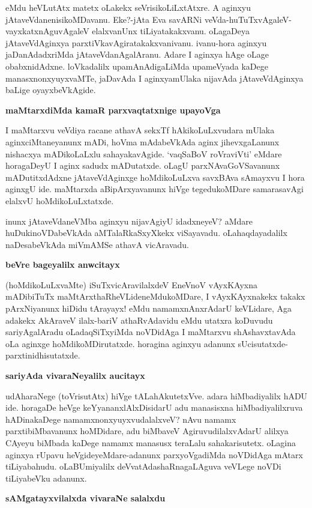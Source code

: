 eMdu heVLutAtx matetx oLakekx seVrisikoLiLxtAtxre. A aginxyu 
jAtaveVdanenisikoMDavanu. Eke?-jAta Eva savARNi 
veVda-huTuTxvAgaleV-vayxkatxnAguvAgaleV elalxvanUnx tiLiyatakakxvanu. oLagaDeya jAtaveVdAginxya parxtiVkavAgiratakakxvanivanu. ivanu-hora aginxyu jaDanAdadxriMda jAtaveVdanAgalAranu. Adare I aginxya hAge oLage obabxnidAdxne. loVkadalilx upamAnAdigaLiMda upameVyada kaDege manasxnonx\-yuyxvaMTe, jaDavAda I aginxyamUlaka nijavAda jAtaveVdAginxya baLige oyayxbeVkAgide.

\noindent
\textbf{maMtarxdiMda kamaR parxvaqtatxnige upayoVga}\label{page117}

I maMtarxvu veVdiya racane athavA sekxTf hAkikoLuLxvudara mUlaka 
aginxciMtaneyanunx mADi, hoVma mAdabeVkAda aginx jihevxgaLanunx nishacxya mADikoLaLxlu sahayakavAgide. `vaqSaBoV roVraviVti' eMdare horagaDeyU I aginx sadudx mADutatxde. oLagU parxNAvaGoVSavanunx mADutitxdAdxne jAtaveVdAginxge hoMdikoLuLxva savxBAva sAmayxvu I hora aginxgU ide. maMtarxda aBipArxyavanunx hiVge tegedukoMDare samarasavAgi elalxvU hoMdikoLuLxtatxde.

inunx jAtaveVdaneVMba aginxyu nijavAgiyU idadxneyeV? aMdare 
huDukinoVDabeVkAda \-aMTalaRkaSxyXkekx viSayavadu. oLahaqdayadalilx naDesabeVkAda miVmAMSe athavA vicAravadu.

\noindent
\textbf{beVre bageyalilx anwcitayx}\label{page117}

(hoMdikoLuLxvaMte) iSuTxvicAravilalxdeV EneVnoV vAyxKAyxna mADibiTuTx 
maMtArxthaRheVLi\-deneMdukoMDare, I vAyxKAyxnakekx takakx pArxNiyanunx 
hiDidu tArayayx! eMdu namamxnAnxrAdarU keVLidare, Aga adakekx 
\-AkAraveV ilalx-bariV athaRvAdavidu eMdu utatxra koDuvudu 
sariyAgalAradu oLadaqSiTxyiMda noVDidAga I maMtarxvu shAshavxtavAda oLa aginxge hoMdikoMDirutatxde. horagina aginxyu adanunx sUcisutatxde-parxtinidhisutatxde.

\noindent
\textbf{sariyAda vivaraNeyalilx aucitayx}\label{page117}

udAharaNege (toVrisutAtx) hiVge tALahAkutetxVve. adara hiMbadiyalilx 
hADU ide. horagaDe heVge keYyananxlAlxDisidarU adu manasisxna 
hiMbadiyalilxruva hADinakaDege namamxnonxyuyxvudalalxveV? nAvu namamx 
parxtibiMbavanunx hoMDidare, adu biMbaveV AgiruvudilalxvAdarU alilxya CAyeyu biMbada kaDege namamx manasusx teraLalu sahakarisutetx. oLagina aginxya rUpavu heVgideyeMdare-adanunx parxyoVgadiMda noVDidAga mAtarx tiLiyabahudu. oLaBUmiyalilx deVvatAdashaRnagaLAguva veVLege noVDi tiLiyabeVku adanunx.

\noindent
\textbf{sAMgatayxvilalxda vivaraNe salalxdu}\label{page118}

